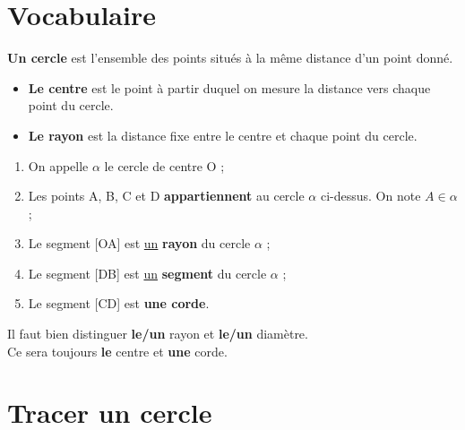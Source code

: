 \documentclass[11pt]{article}
\begin{document}
\section{Vocabulaire}

\begin{definition}
  \textbf{Un cercle} est l'ensemble des points situés à la même distance d'un
  point donné.
\end{definition}

\begin{vocabulaire}
  \begin{itemize}
  \item \textbf{Le centre} est le point à partir duquel on mesure la
    distance vers chaque point du cercle.
  \item \textbf{Le rayon} est la distance fixe entre le centre et chaque point
    du cercle.
  \end{itemize}
\end{vocabulaire}

\begin{exemple}
  \begin{center}
    
  \end{center}
\end{exemple}

\begin{vocabulaire}
  \begin{enumerate}
  \item On appelle $\alpha$ le cercle de centre O ; 
  \item Les points A, B, C et D \textbf{appartiennent} au cercle
    $\alpha$ ci-dessus. On note $A \in \alpha$ ;
  \item Le segment [OA] est \underline{un} \textbf{rayon} du cercle
    $\alpha$ ;
  \item Le segment [DB] est \underline{un} \textbf{segment} du cercle
    $\alpha$ ;
  \item Le segment [CD] est \textbf{une corde}.
  \end{enumerate}
\end{vocabulaire}

\begin{remarque}
Il faut bien distinguer \textbf{le/un} rayon et \textbf{le/un}
diamètre. \\
Ce sera toujours \textbf{le} centre et \textbf{une} corde.            
\end{remarque}

\newpage

\section{Tracer un cercle}
\end{document}
